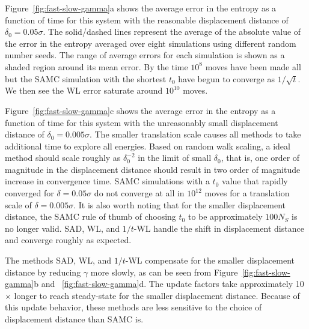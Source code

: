 \documentclass[letterpaper,twocolumn,amsmath,amssymb,pre,aps,10pt]{revtex4-1}
\begin{document}
Figure~\ref{fig:fast-slow-gamma}a shows the average error in the
entropy as a function of time for this system with the reasonable
displacement distance of $\delta_0 = 0.05\sigma$.  The solid/dashed lines
represent the average of the absolute value of the error in the
entropy averaged over eight simulations using different random number
seeds.  The range of average errors for each simulation is shown as a
shaded region around its mean error.  By the time $10^8$ moves have
been made all but the SAMC simulation with the shortest $t_0$ have
begun to converge as $1/\sqrt{t}$.  We then see the WL error
saturate around $10^{10}$ moves.

Figure~\ref{fig:fast-slow-gamma}c shows the average error in
the entropy as a function of time for this system with the
unreasonably small displacement distance of $\delta_0 = 0.005\sigma$.
%
The smaller translation scale causes all methods to take additional
time to explore all energies. Based on random walk scaling, a ideal
method should scale roughly as $\delta_0^{-2}$ in the limit of small
$\delta_0$, that is, one order of magnitude in the displacement
distance should result in two order of magnitude increase in
convergence time. SAMC simulations with a $t_0$ value that rapidly
converged for $\delta = 0.05\sigma$ do not converge at all in $10^{12}$
moves for a translation scale of $\delta = 0.005\sigma$. It is also
worth noting that for the smaller displacement distance, the SAMC rule
of thumb of choosing $t_0$ to be approximately $100N_S$ is no longer
valid. SAD, WL, and $1/t$-WL handle the shift in displacement distance
and converge roughly as expected.

The methods SAD, WL, and $1/t$-WL compensate for the smaller
displacement distance by reducing $\gamma$ more slowly, as can be seen from
Figure~\ref{fig:fast-slow-gamma}b and ~\ref{fig:fast-slow-gamma}d.
The update factors take approximately 10$\times$ longer to reach steady-state
for the smaller displacement distance. Because of this update behavior,
these methods are less sensitive to the choice of displacement
distance than SAMC is.

%
\end{document}
